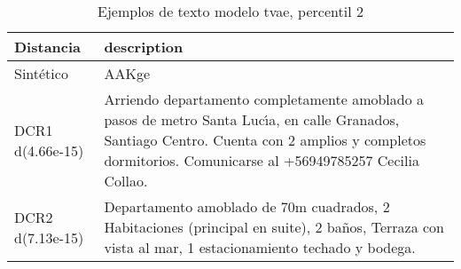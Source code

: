 \begin{table}[H]
\centering
\fontsize{10}{14}\selectfont
\caption{Ejemplos de texto modelo tvae, percentil 2}
\label{table-example-economicos-b-3-tvae-2p-text}
\begin{tabular}{|l|m{35em}|}
\hline
\rowcolor[gray]{0.8}
Distancia & description \\
\hline Sintético & AAKge \\
\hline DCR1 d(4.66e-15) & Arriendo departamento completamente amoblado a pasos de metro Santa Luc{\'\i}a, en calle Granados, Santiago Centro. 
Cuenta con 2 amplios y completos dormitorios.
Comunicarse al +56949785257 Cecilia Collao. \\
\hline DCR2 d(7.13e-15) & Departamento amoblado de 70m cuadrados,
2 Habitaciones (principal en suite),
2 ba\~nos,
Terraza con vista al mar,
1 estacionamiento techado y bodega. \\
\hline
\end{tabular}
\end{table}
